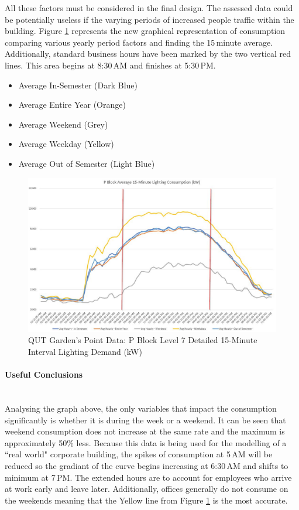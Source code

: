 All these factors must be considered in the final design. The assessed data could be potentially useless if the varying periods of increased people traffic within the building. Figure \ref {fig:pblock-lvl7-15-minute-detailed} represents the new graphical representation of consumption comparing various yearly period factors and finding the 15\,minute average. Additionally, standard business hours have been marked by the two vertical red lines. This area begins at 8:30\,AM and finishes at 5:30\,PM.  

\begin{itemize} [noitemsep]
	\item Average In-Semester (Dark Blue)
	\item Average Entire Year (Orange)
	\item Average Weekend (Grey)
	\item Average Weekday (Yellow)
	\item Average Out of Semester (Light Blue)
\end{itemize}

\begin{figure}[H]
	\hfill\includegraphics[width = 150mm]{images/metering/pme/pblock-lvl7-daily-avg-kw-detailed}\hspace*{\fill}
	\caption{QUT Garden's Point Data: P Block Level 7 Detailed 15-Minute Interval Lighting Demand (kW)} 
	\label{fig:pblock-lvl7-15-minute-detailed}
\end{figure}
  
\paragraph{Useful Conclusions}
~\\
Analysing the graph above, the only variables that impact the consumption significantly is whether it is during the week or a weekend. It can be seen that weekend consumption does not increase at the same rate and the maximum is approximately 50\% less. Because this data is being used for the modelling of a ``real world" corporate building, the spikes of consumption at 5\,AM will be reduced so the gradiant of the curve begins increasing at 6:30\,AM and shifts to minimum at 7\,PM. The extended hours are to account for employees who arrive at work early and leave later.  Additionally, offices generally do not consume on the weekends meaning that the Yellow line from Figure \ref{fig:pblock-lvl7-15-minute-detailed} is the most accurate.   
 
\newpage